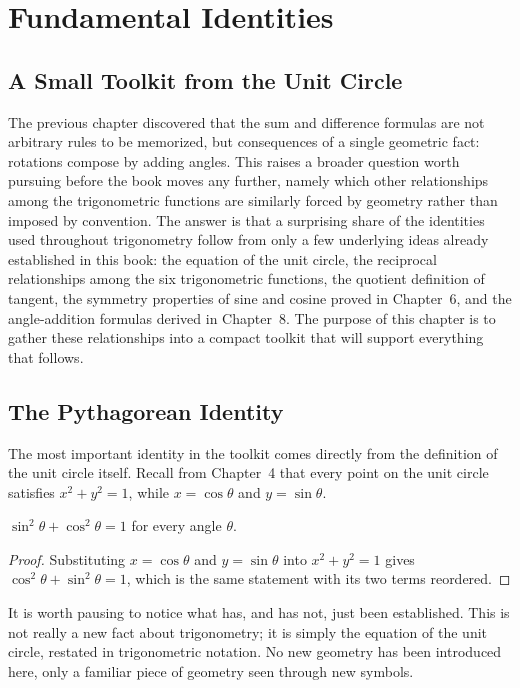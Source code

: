 \chapter{Fundamental Identities}
\label{ch:ch09-identities}

\section{A Small Toolkit from the Unit Circle}

The previous chapter discovered that the sum and difference formulas are
not arbitrary rules to be memorized, but consequences of a single
geometric fact: rotations compose by adding angles. This raises a broader
question worth pursuing before the book moves any further, namely which
other relationships among the trigonometric functions are similarly forced
by geometry rather than imposed by convention. The answer is that a
surprising share of the identities used throughout trigonometry follow from
only a few underlying ideas already established in this book: the equation
of the unit circle, the reciprocal relationships among the six
trigonometric functions, the quotient definition of tangent, the symmetry
properties of sine and cosine proved in Chapter~6, and the angle-addition
formulas derived in Chapter~8. The purpose of this chapter is to gather
these relationships into a compact toolkit that will support everything
that follows.

\section{The Pythagorean Identity}

The most important identity in the toolkit comes directly from the
definition of the unit circle itself. Recall from Chapter~4 that every
point on the unit circle satisfies $x^2+y^2=1$, while $x = \cos\theta$ and
$y = \sin\theta$.

\begin{theorem}
$\sin^2\theta + \cos^2\theta = 1$ for every angle $\theta$.
\end{theorem}

\begin{proof}
Substituting $x=\cos\theta$ and $y=\sin\theta$ into $x^2+y^2=1$ gives
$\cos^2\theta + \sin^2\theta = 1$, which is the same statement with its two
terms reordered.
\end{proof}

It is worth pausing to notice what has, and has not, just been
established. This is not really a new fact about trigonometry; it is
simply the equation of the unit circle, restated in trigonometric notation.
No new geometry has been introduced here, only a familiar piece of
geometry seen through new symbols.

